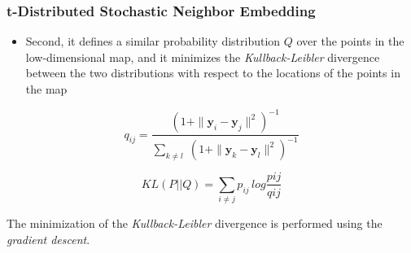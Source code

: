\begin{frame}
	\frametitle{t-Distributed Stochastic Neighbor Embedding}
	
	\vspace{0.3cm}
	
	\begin{itemize}
		\item Second, it defines a similar probability distribution $ Q $ over the points in the low-dimensional map,
			  and it minimizes the \emph{Kullback-Leibler} divergence between the two distributions with respect to
			  the locations of the points in the map
	\end{itemize}
	
	\begin{equation*}
		q_{ij} = \frac{(1 + \| \boldsymbol{y}_i - \boldsymbol{y}_j \|^2)^{-1}}{\sum_{k \neq l} \; (1 + \| \boldsymbol{y}_k - \boldsymbol{y}_l \|^2)^{-1}}
	\end{equation*}
	
	\vspace{0.3cm}
	
	\begin{equation*}
		KL(P||Q) = \sum_{i \neq j} p_{ij} \, log\frac{p{ij}}{q{ij}}
	\end{equation*}
	
	\vspace{0.2cm}
	
	The minimization of the \emph{Kullback-Leibler} divergence is performed using the \emph{gradient descent}.
\end{frame}
